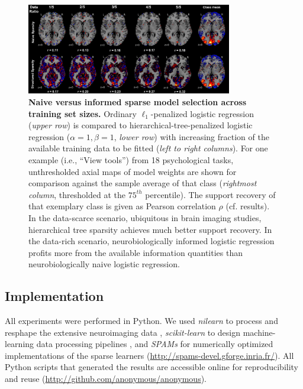 \documentclass{article}
\begin{document}
\begin{figure}
\begin{centering}
\includegraphics[width=0.80\textwidth]{../figures/dataratio_trans.pdf}
\caption{\textbf{Naive versus informed sparse model selection
across training set sizes.}
Ordinary $\ell_1$-penalized logistic regression
(\textit{upper row})
is compared
to hierarchical-tree-penalized logistic regression
($\alpha = 1, \beta = 1$, \textit{lower row})
with increasing fraction
of the available training data
to be fitted (\textit{left to right columns}).
For one example (i.e., ``View tools'') from 18 psychological tasks,
unthresholded axial maps of model weights
are shown for comparison against
the sample average of that class
(\textit{rightmost column}, thresholded at the $75^{th}$ percentile).
The support recovery of that exemplary class is given
as Pearson correlation $\rho$ (cf. results).
%
In the data-scarce scenario,
ubiquitous in brain imaging studies,
hierarchical tree sparsity achieves much
better support recovery.
%
In the data-rich scenario,
neurobiologically informed logistic regression
profits more from the available information quantities than
neurobiologically naive logistic regression.
}
\label{Tab:fig_dataratio}
\end{centering}
\end{figure}

\subsection{Implementation}
All experiments were performed in Python.
We used \textit{nilearn} to process and resphape
the extensive neuroimaging data 
\cite{abrah14},
\textit{scikit-learn} to design machine-learning
data processing pipelines
\cite{pedr11},
and
\textit{SPAMs} for numerically optimized
implementations of the sparse learners
(\url{http://spams-devel.gforge.inria.fr/}).
All Python scripts that generated the results are
accessible online for reproducibility and reuse
(\url{http://github.com/anonymous/anonymous}).
  
\end{document}
